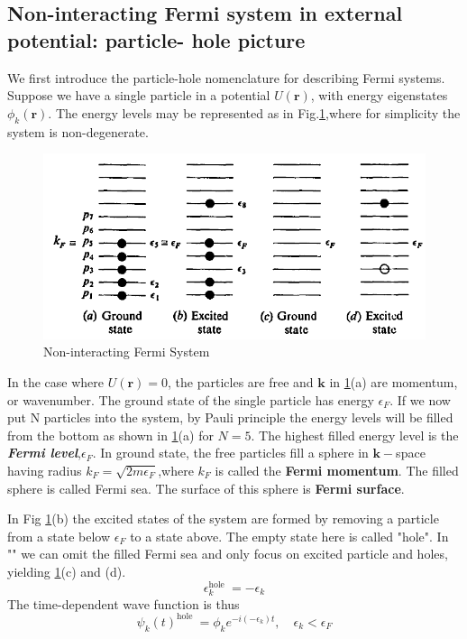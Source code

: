 \subsection{Non-interacting Fermi system in external potential: particle- hole picture}
We first introduce the particle-hole nomenclature for describing Fermi systems. Suppose we have a single particle in a potential $U(\mathbf{r})$, with energy eigenstates $\phi_k(\mathbf{r})$. The energy levels may be represented as in Fig.\ref{fig:non-interacting-fermi},where for simplicity the system is non-degenerate.
\begin{figure}[H]
    \centering
    \includegraphics[scale=0.6]{screenshots/particle-hole.PNG}
    \caption{Non-interacting Fermi System}
    \label{fig:non-interacting-fermi}
\end{figure}
In the case where $U(\mathbf{r})=0$, the particles are free and $\mathbf{k}$ in \ref{fig:non-interacting-fermi}(a) are momentum, or wavenumber. The ground state of the single particle has energy $\epsilon_F$. If we now put N particles into the system, by Pauli principle the energy levels will be filled from the bottom as shown in \ref{fig:non-interacting-fermi}(a) for $N=5$. The highest filled energy level is the \textit{\textbf{Fermi level}},$\epsilon_F$. In ground state, the free particles fill a sphere in $\mathbf{k}-$space having radius $k_F=\sqrt{2m\epsilon_F}$,where $k_F$ is called the \textbf{Fermi momentum}. The filled sphere is called Fermi sea. The surface of this sphere is \textbf{Fermi surface}.

In Fig \ref{fig:non-interacting-fermi}(b) the excited states of the system are formed by removing a particle from a state below $\epsilon_F$ to a state above. The empty state here is called "hole". In "" we can omit the filled Fermi sea and only focus on excited particle and holes, yielding \ref{fig:non-interacting-fermi}(c) and (d). \textbf{}
\begin{equation}\epsilon_{k}^{\text {hole }}=-\epsilon_{k}\end{equation}
The time-dependent wave function is thus
\begin{equation}\psi_{k}(t)^{\text {hole }}=\phi_{k} e^{-i\left(-\epsilon_{k}\right) t}, \quad \epsilon_{k}<\epsilon_{F}\end{equation}
